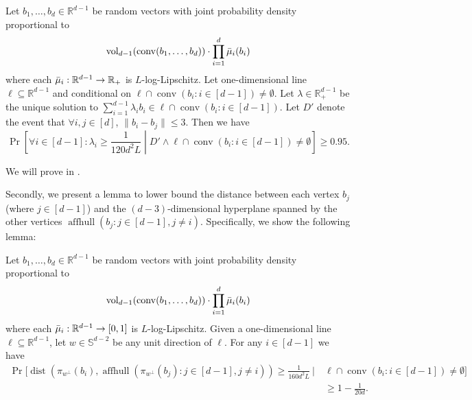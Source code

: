 \documentclass{theoretics}
\newcommand{\R}{\mathbb R}
\newcommand{\aff}{\operatorname{affhull}}
\newcommand{\conv}{\operatorname{conv}}
\newcommand{\dist}{\operatorname{dist}}
\newcommand{\vol}{\operatorname{vol}}
\renewcommand{\subset}{\subseteq}
\begin{document}
\begin{lemma}\label{lem:ridge-lambda-lb}
    Let $b_1,\ldots,b_d \in \R^{d-1}$ be random vectors with joint probability density proportional
    to
    \[
    \vol_{d-1}(\conv(b_1, \ldots, b_d)) \cdot \prod_{i=1}^d \Bar{\mu}_i(b_i)
    \]
    where each $\Bar\mu_i : \R^{d-1} \to \R_+$ is $L$-log-Lipschitz.
    Let one-dimensional line $\ell \subset \R^{d-1}$ and conditional on $\ell \cap \conv(b_i : i\in [d-1]) \neq \emptyset$.
    Let $\lambda \in \R^{d-1}_+$ be the unique solution to $\sum_{i=1}^{d-1} \lambda_i b_i \in \ell \cap \conv(b_i : i\in [d-1])$.
    Let $D'$ denote the event that $\forall i, j \in [d]$, $\|b_i - b_j\| \leq 3$.
    Then we have
    \[
    \Pr\left[ \forall i \in [d-1] : \lambda_i \geq \frac{1}{120d^2 L} \middle| D' \wedge \ell \cap \conv(b_i : i\in [d-1]) \neq \emptyset \right] \geq 0.95.
    \]
\end{lemma}
We will prove  in .

Secondly, we present a lemma to lower bound the distance between each vertex $b_j$ (where $j \in [d-1]$) and the $(d-3)$-dimensional hyperplane spanned by the other vertices $\aff(b_j : j \in [d-1], j\neq i)$. Specifically, we show the following lemma:

\begin{lemma}\label{lem:facet-distance-lb}
   Let $b_1,\ldots,b_d \in \R^{d-1}$ be random vectors with joint probability density proportional to
    \[
    \vol_{d-1}(\conv(b_1, \ldots, b_d)) \cdot \prod_{i=1}^d \Bar{\mu}_i(b_i)
    \]
    where each $\Bar\mu_i : \R^{d-1} \to [0, 1]$ is $L$-log-Lipschitz.
    Given a one-dimensional line $\ell \subset \R^{d-1}$, let $w \in \mathbb{S}^{d-2}$ be any unit direction of $\ell$.
    For any $i \in [d-1]$ we have
    \begin{align*}
        \Pr\Big[ \dist \left( \pi_{w^\perp}(b_i), \aff(\pi_{w^\perp}(b_j) : j \in [d-1], j \neq i) \right) \geq \frac{1}{160 d^2L} ~\Big|~
        & \ell \cap \conv(b_i : i\in [d-1]) \neq \emptyset \Big] \\
        &\geq 1-\frac{1}{20d}.
    \end{align*}
\end{lemma}
\end{document}
